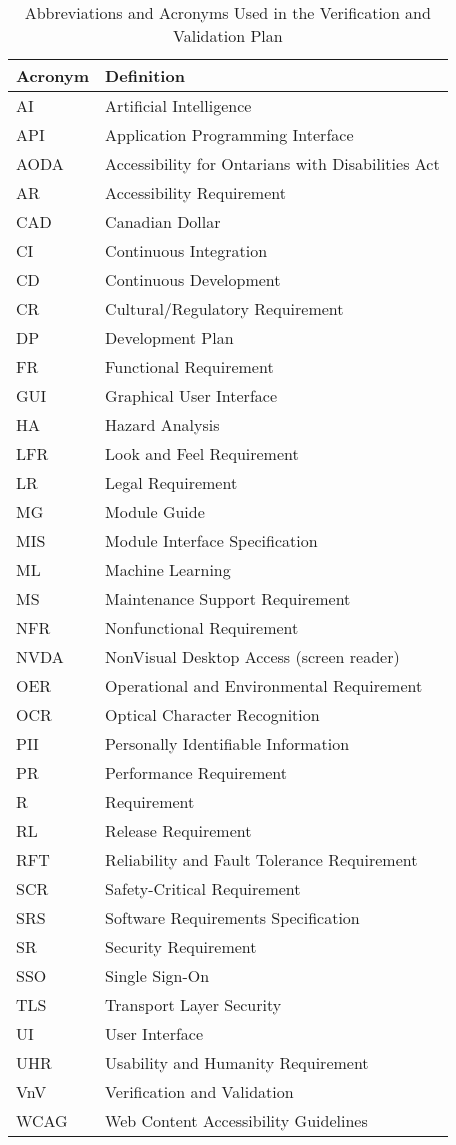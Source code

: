 \documentclass[12pt, titlepage]{article}
\begin{document}
\begin{table}[H]
\centering
\caption{Abbreviations and Acronyms Used in the Verification and Validation Plan}
\begin{tabular}{|l|l|}
\hline
\textbf{Acronym} & \textbf{Definition} \\
\hline
AI & Artificial Intelligence \\
API & Application Programming Interface \\
AODA & Accessibility for Ontarians with Disabilities Act \\
AR & Accessibility Requirement \\
CAD & Canadian Dollar \\
CI & Continuous Integration \\
CD & Continuous Development \\
CR & Cultural/Regulatory Requirement \\
DP & Development Plan \\
FR & Functional Requirement \\
GUI & Graphical User Interface \\
HA & Hazard Analysis \\
LFR & Look and Feel Requirement \\
LR & Legal Requirement \\
MG & Module Guide \\
MIS & Module Interface Specification \\
ML & Machine Learning \\
MS & Maintenance Support Requirement \\
NFR & Nonfunctional Requirement \\
NVDA & NonVisual Desktop Access (screen reader) \\
OER & Operational and Environmental Requirement \\
OCR & Optical Character Recognition \\
PII & Personally Identifiable Information \\
PR & Performance Requirement \\
R & Requirement \\
RL & Release Requirement \\
RFT & Reliability and Fault Tolerance Requirement \\
SCR & Safety-Critical Requirement \\
SRS & Software Requirements Specification \\
SR & Security Requirement \\
SSO & Single Sign-On \\
TLS & Transport Layer Security \\
UI & User Interface \\
UHR & Usability and Humanity Requirement \\
VnV & Verification and Validation \\
WCAG & Web Content Accessibility Guidelines \\
\hline
\end{tabular}
\end{table}
\end{document}
